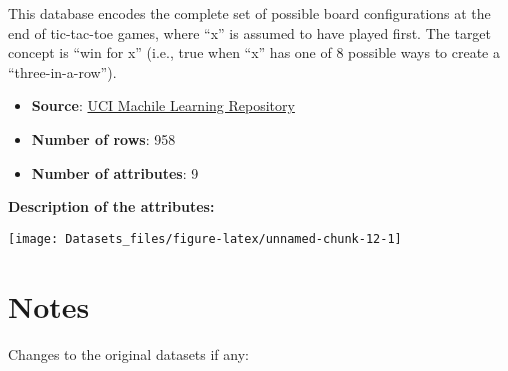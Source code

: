 \documentclass[]{article}
\providecommand{\tightlist}{%
  \setlength{\itemsep}{0pt}\setlength{\parskip}{0pt}}
\begin{document}
This database encodes the complete set of possible board configurations
at the end of tic-tac-toe games, where ``x'' is assumed to have played
first. The target concept is ``win for x'' (i.e., true when ``x'' has
one of 8 possible ways to create a ``three-in-a-row'').

\begin{itemize}
\tightlist
\item
  \textbf{Source}:
  \href{http://archive.ics.uci.edu/ml/datasets/Tic-Tac-Toe+Endgame}{UCI
  Machile Learning Repository}
\item
  \textbf{Number of rows}: 958
\item
  \textbf{Number of attributes}: 9
\end{itemize}

\textbf{Description of the attributes:}

\texttt{[image: Datasets\_files/figure-latex/unnamed-chunk-12-1]}

\hypertarget{notes}{%
\section{Notes}\label{notes}}

Changes to the original datasets if any:
\end{document}
